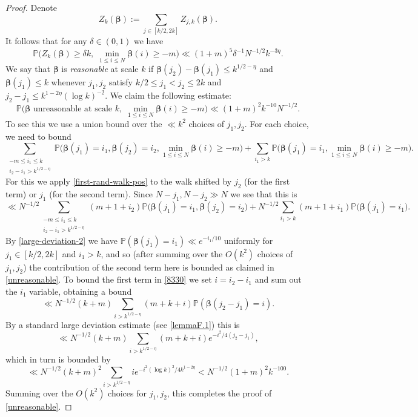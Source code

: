 \documentclass[11pt,reqno]{amsart}
\numberwithin{equation}{section}
\theoremstyle{definition}
\theoremstyle{remark}
\newcommand{\mb}{\mathbb}
\def\boldbeta{\boldsymbol\beta}
\renewcommand{\le}{\leqslant}
\renewcommand{\ge}{\geqslant}
\begin{document}
\begin{proof}
Denote
\[ Z_k(\boldbeta) := \sum_{j \in [k/2, 2k]} Z_{j,k}(\boldbeta).\]
It follows that for any $\delta \in (0,1)$ we have 
\begin{equation}\label{zk-bd} \mb{P} \big( Z_k(\boldbeta) \ge \delta k,\; \min_{1 \le i \le N} \boldbeta(i) \ge  -m \big)\ll (1 + m)^5 \delta^{-1} N^{-1/2}k^{ - 3\eta}. \end{equation}
We say that $\boldbeta$ is \emph{reasonable} at scale $k$ if $\boldbeta(j_2) - \boldbeta(j_1) \le k^{1/2 - \eta}$ and $\boldbeta(j_1) \le k$ whenever $j_1, j_2$ satisfy $k/2 \le j_1 < j_2 \le 2k$ and $j_2 - j_1 \le k^{1 - 2\eta} (\log k)^{-2}$. We claim the following estimate:
\begin{equation}\label{unreasonable}\mb{P} \big( \mbox{$\boldbeta$ unreasonable at scale $k$}, \; \min_{1 \le i \le N} \boldbeta(i) \ge - m \big) \ll (1 + m)^{2} k^{-10} N^{-1/2}. \end{equation}
To see this we use a union bound over the $\ll k^2$ choices of $j_1, j_2$. For each choice, we need to bound
\[ \sum_{\substack{-m \le i_1 \le k \\ i_2 - i_1 > k^{1/2 - \eta}}}  \mb{P} \big (\boldbeta(j_1) = i_1, \boldbeta(j_2) = i_2, \min_{1 \le i \le N} \boldbeta(i) \ge -m\big) + \sum_{i_1 > k} \mb{P} \big (\boldbeta(j_1) = i_1, \min_{1 \le i \le N} \boldbeta(i) \ge -m\big).\]
For this we apply \cref{first-rand-walk-pos} to the walk shifted by $j_2$ (for the first term) or $j_1$ (for the second term). Since $N- j_1, N - j_2 \gg N$ we see that this is
\begin{equation}\label{8330} \ll N^{-1/2}\!\!\!\!\!\!\sum_{\substack{-m \le i_1 \le k \\ i_2 - i_1 > k^{1/2 - \eta}}} \!\!\!\!(m + 1 + i_2) \mb{P} \big (\boldbeta(j_1) = i_1, \boldbeta(j_2) = i_2\big) + N^{-1/2} \sum_{i_1 > k} (m + 1 + i_1) \mb{P} \big (\boldbeta(j_1) = i_1\big).\end{equation}
By \cref{large-deviation-2} we have $\mb{P}(\boldbeta(j_1) = i_1) \ll e^{-i_1/10}$ uniformly for $j_1 \in [k/2, 2k]$ and $i_1 > k$, and so (after summing over the $O(k^2)$ choices of $j_1, j_2$) the contribution of the second term here is bounded as claimed in \cref{unreasonable}. To bound the first term in \cref{8330} we set $i = i_2 - i_1$ and sum out the $i_1$ variable, obtaining a bound
\[ \ll N^{-1/2}(k + m) \sum_{i > k^{1/2 - \eta}} (m + k + i) \mb{P}(\boldbeta (j_2 - j_1) = i) .\] By a standard large deviation estimate (see \cref{lemmaF.1}) this is \[ \ll N^{-1/2}(k+m) \sum_{i > k^{1/2 - \eta}} (m + k + i) e^{-i^2/4(j_2 - j_1)},\]  which in turn is bounded by\[ \ll N^{-1/2}(k + m)^2 \sum_{i > k^{1/2 - \eta}} i e^{-i^2(\log k)^2/4k^{1 - 2\eta}} < N^{-1/2}(1 + m)^{2} k^{-100}.\] Summing over the $O(k^2)$ choices for $j_1, j_2$, this completes the proof of \cref{unreasonable}. 


\end{proof}
\end{document}
